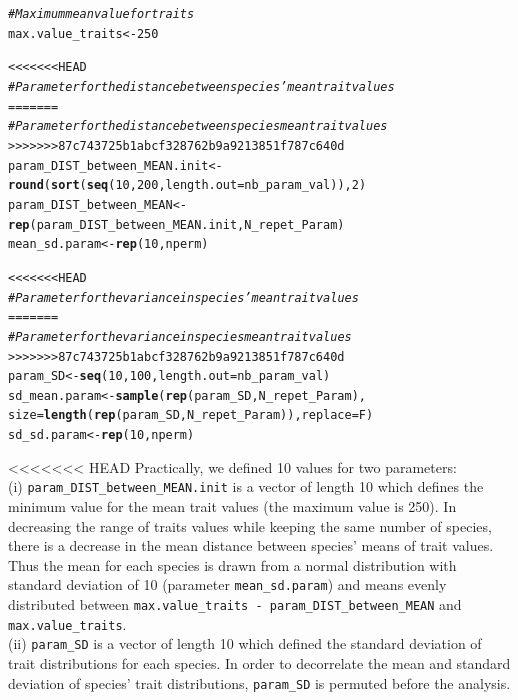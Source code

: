 \documentclass[12pt]{article}\usepackage[]{graphicx}\usepackage[]{color}
\makeatletter
\newcommand{\hlnum}[1]{\textcolor[rgb]{0.686,0.059,0.569}{#1}}%
\newcommand{\hlcom}[1]{\textcolor[rgb]{0.678,0.584,0.686}{\textit{#1}}}%
\newcommand{\hlstd}[1]{\textcolor[rgb]{0.345,0.345,0.345}{#1}}%
\newcommand{\hlkwb}[1]{\textcolor[rgb]{0.69,0.353,0.396}{#1}}%
\newcommand{\hlkwc}[1]{\textcolor[rgb]{0.333,0.667,0.333}{#1}}%
\newcommand{\hlkwd}[1]{\textcolor[rgb]{0.737,0.353,0.396}{\textbf{#1}}}%
\newenvironment{kframe}{%
 \def\at@end@of@kframe{}%
 \ifinner\ifhmode%
  \def\at@end@of@kframe{\end{minipage}}%
  \begin{minipage}{\columnwidth}%
 \fi\fi%
 \def\FrameCommand##1{\hskip\@totalleftmargin \hskip-\fboxsep
 \colorbox{shadecolor}{##1}\hskip-\fboxsep
     \hskip-\linewidth \hskip-\@totalleftmargin \hskip\columnwidth}%
 \MakeFramed {\advance\hsize-\width
   \@totalleftmargin\z@ \linewidth\hsize
   \@setminipage}}%
 {\par\unskip\endMakeFramed%
 \at@end@of@kframe}
\newenvironment{knitrout}{}{} %
\makeatother
\begin{document}
\begin{landscape}
\begin{knitrout}
\begin{kframe}
\begin{alltt}
\hlcom{# Maximum mean value for traits}
\hlstd{max.value_traits} \hlkwb{<-} \hlnum{250}

<<<<<<< HEAD
\hlcom{# Parameter for the distance between species' mean trait values}
=======
\hlcom{# Parameter for the distance between species mean trait values}
>>>>>>> 87c743725b1abcf328762b9a9213851f787c640d
\hlstd{param_DIST_between_MEAN.init} \hlkwb{<-} \hlkwd{round}\hlstd{(}\hlkwd{sort}\hlstd{(}\hlkwd{seq}\hlstd{(}\hlnum{10}\hlstd{,} \hlnum{200}\hlstd{,} \hlkwc{length.out} \hlstd{= nb_param_val)),} \hlnum{2}\hlstd{)}
\hlstd{param_DIST_between_MEAN} \hlkwb{<-} \hlkwd{rep}\hlstd{(param_DIST_between_MEAN.init, N_repet_Param)}
\hlstd{mean_sd.param} \hlkwb{<-} \hlkwd{rep}\hlstd{(}\hlnum{10}\hlstd{, nperm)}

<<<<<<< HEAD
\hlcom{# Parameter for the variance in species' mean trait values}
=======
\hlcom{# Parameter for the variance in species mean trait values}
>>>>>>> 87c743725b1abcf328762b9a9213851f787c640d
\hlstd{param_SD} \hlkwb{<-} \hlkwd{seq}\hlstd{(}\hlnum{10}\hlstd{,} \hlnum{100}\hlstd{,}\hlkwc{length.out} \hlstd{= nb_param_val)}
\hlstd{sd_mean.param} \hlkwb{<-} \hlkwd{sample} \hlstd{(}\hlkwd{rep}\hlstd{(param_SD, N_repet_Param),}
       \hlkwc{size} \hlstd{=} \hlkwd{length}\hlstd{(}\hlkwd{rep}\hlstd{(param_SD, N_repet_Param)),} \hlkwc{replace} \hlstd{= F)}
\hlstd{sd_sd.param} \hlkwb{<-} \hlkwd{rep}\hlstd{(}\hlnum{10}\hlstd{, nperm)}
\end{alltt}
\end{kframe}
\end{knitrout}


<<<<<<< HEAD
 Practically, we defined 10 values for two parameters:
\\

 (i) \texttt{param\_{}DIST\_{}between\_{}MEAN.init} is a vector of length 10 which defines the minimum value for the mean trait values (the maximum value is 250). In decreasing the range of traits values while keeping the same number of species, there is a decrease in the mean distance between species' means of trait values. Thus the mean for each species is drawn from a normal distribution with standard deviation of 10 (parameter \texttt{mean\_{}sd.param}) and means evenly distributed between \texttt{max.value\_{}traits - param\_{}DIST\_{}between\_{}MEAN} and \texttt{max.value\_{}traits}.
\\

(ii) \texttt{param\_{}SD} is a vector of length 10 which defined the standard deviation of trait distributions for each species. In order to decorrelate the mean and standard deviation of species' trait distributions, \texttt{param\_{}SD} is permuted before the analysis. 
\\


\end{landscape}
\end{document}

